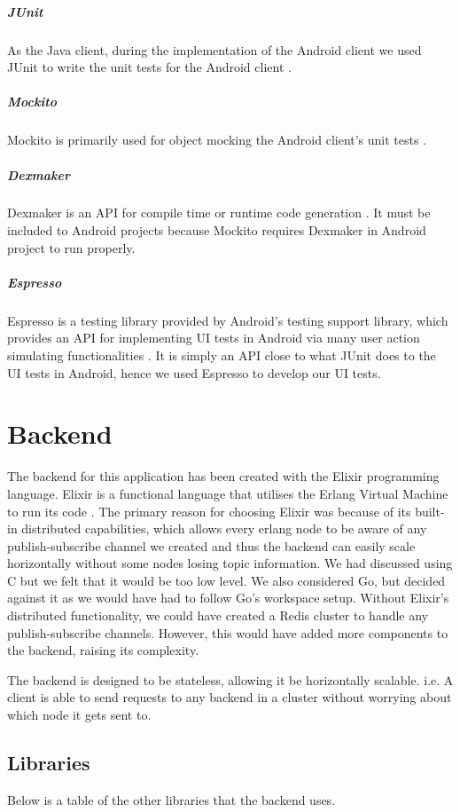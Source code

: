 \documentclass[11pt,a4paper]{report}
\begin{document}
\subparagraph{JUnit}
As the Java client, during the implementation of the Android client we used JUnit to write the unit tests for the Android client \cite{website:junit_homepage}.
\subparagraph{Mockito}
Mockito is primarily used for object mocking the Android client’s unit tests \cite {website:mockito_homepage}.
\subparagraph{Dexmaker}
Dexmaker is an API for compile time or runtime code generation \cite{website:dexmaker_homepage}. It must be included to Android projects because Mockito requires Dexmaker in Android project to run properly.
\subparagraph{Espresso}
Espresso is a testing library provided by Android’s testing support library, which provides an API for implementing UI tests in Android via many user action simulating functionalities \cite{website:espresso_homepage}. It is simply an API close to what JUnit does to the UI tests in Android, hence we used Espresso to develop our UI tests.

\section{Backend}

The backend for this application has been created with the Elixir programming language. Elixir is a functional language that utilises the Erlang Virtual Machine to run its code \cite{website:elixir_homepage}. The primary reason for choosing Elixir was because of its built-in distributed capabilities, which allows every erlang node to be aware of any publish-subscribe channel we created and thus the backend can easily scale horizontally without some nodes losing topic information. We had discussed using C but we felt that it would be too low level. We also considered Go, but decided against it as we would have had to follow Go's workspace setup.  Without Elixir's distributed functionality, we could have created a Redis cluster to handle any publish-subscribe channels. However, this would have added more components to the backend, raising its complexity.

The backend is designed to be stateless, allowing it be horizontally scalable. i.e. A client is able to send requests to any backend in a cluster without worrying about which node it gets sent to.

\subsection{Libraries}

Below is a table of the other libraries that the backend uses.
\end{document}
